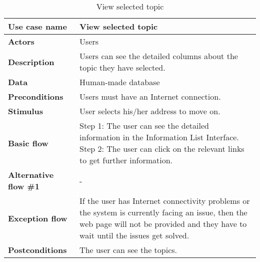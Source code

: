\documentclass[listof=nochaptergap]{report}
\begin{document}
    \begin{table}[H]
        \centering
         \begin{tabular}{| p{4cm} | p{10cm} |} 
         \hline
         \textbf{Use case name} & View selected topic \\
         \hline
         \textbf{Actors} & Users \\
         \hline
         \textbf{Description} & Users can see the detailed columns about the topic they have selected. \\
         \hline
         \textbf{Data} & Human-made database \\
         \hline
         \textbf{Preconditions} & Users must have an Internet connection. \\
         \hline
         \textbf{Stimulus} & User selects his/her address to move on. \\
         \hline
         \textbf{Basic flow} & Step 1: The user can see the detailed information in the Information List Interface. \newline Step 2: The user can click on the relevant links to get further information. \\
         \hline
         \textbf{Alternative flow \#1} & - \\
         \hline
         \textbf{Exception flow} & If the user has Internet connectivity problems or the system is currently facing an issue, then the web page will not be provided and they have to wait until the issues get solved. \\
         \hline
         \textbf{Postconditions} & The user can see the topics. \\
         \hline
         \end{tabular}
        \caption{View selected topic}
        \label{tab:table12}
    \end{table}
\end{document}
